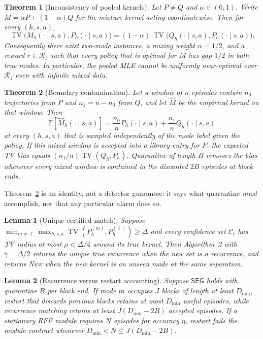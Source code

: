 \documentclass[11pt]{article}
\newtheorem{theorem}{Theorem}
\newtheorem{lemma}{Lemma}
\newcommand{\Rone}{\mathcal{R}_1}
\newcommand{\TV}{\operatorname{TV}}
\newcommand{\SEG}{\mathsf{SEG}}
\newcommand{\E}{\mathbb{E}}
\newcommand{\cC}{\mathcal{C}}
\begin{document}
\begin{theorem}[Inconsistency of pooled kernels]
\label{thm:pool}
Let $P\neq Q$ and $\alpha\in(0,1)$. Write $M=\alpha P+(1-\alpha)Q$ for the
mixture kernel acting coordinatewise. Then for every $(h,s,a)$,
\[
\TV\bigl(M_h(\cdot\mid s,a),P_h(\cdot\mid s,a)\bigr)
=(1-\alpha)\,\TV\bigl(Q_h(\cdot\mid s,a),P_h(\cdot\mid s,a)\bigr).
\]
Consequently there exist two-mode instances, a mixing weight $\alpha=1/2$,
and a reward $r\in\Rone$ such that every policy that is optimal for $M$ has
gap $1/2$ in both true modes. In particular, the pooled MLE cannot be
uniformly near-optimal over $\Rone$ even with infinite mixed data.
\end{theorem}

\begin{theorem}[Boundary contamination]
\label{thm:contam}
Let a window of $n$ episodes contain $n_0$ trajectories from $P$ and
$n_1=n-n_0$ from $Q$, and let $\widehat M$ be the empirical kernel on that
window. Then
\[
\E[\widehat M_h(\cdot\mid s,a)]
=\frac{n_0}{n}P_h(\cdot\mid s,a)+\frac{n_1}{n}Q_h(\cdot\mid s,a)
\]
at every $(h,s,a)$ that is sampled independently of the mode label given the
policy. If this mixed window is accepted into a library entry for $P$, the
expected TV bias equals $(n_1/n)\TV(Q_h,P_h)$. Quarantine of length $B$
removes the bias whenever every mixed window is contained in the discarded
$2B$ episodes at block ends.
\end{theorem}
Theorem~\ref{thm:contam} is an identity, not a detector guarantee: it says
what quarantine \emph{must} accomplish, not that any particular alarm does so.

\begin{lemma}[Unique certified match]
\label{lem:match}
Suppose $\min_{m\neq\ell}\max_{h,s,a}\TV(P_h^{(m)},P_h^{(\ell)})\ge\Delta$
and every confidence set $\cC_i$ has TV radius at most $\rho<\Delta/4$ around
its true kernel. Then Algorithm~2 with $\gamma=\Delta/2$ returns the unique
true recurrence when the new set is a recurrence, and returns \textsc{New}
when the new kernel is an unseen mode at the same separation.
\end{lemma}

\begin{lemma}[Recurrence versus restart accounting]
\label{lem:account}
Suppose $\SEG$ holds with quarantine $B$ per block end. If mode $m$ occupies
$J$ blocks of length at least $D_{\min}$, restart that discards previous
blocks retains at most $D_{\min}$ useful episodes, while recurrence matching
retains at least $J(D_{\min}-2B)$ accepted episodes. If a stationary RFE
module requires $N$ episodes for accuracy $\eta$, restart fails the module
contract whenever $D_{\min}<N\le J(D_{\min}-2B)$.
\end{lemma}
\end{document}
